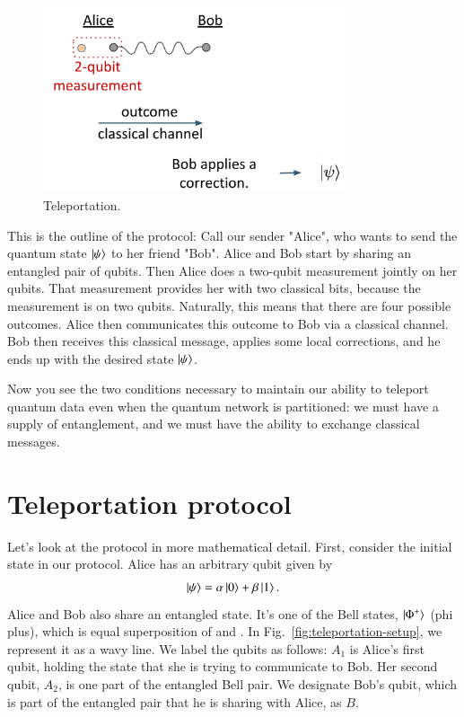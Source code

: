 \begin{figure}[H]
    \centering
    \includegraphics[width=0.8\textwidth]{lesson8/teleportation.png}
        \caption{Teleportation.}
    \label{fig:teleportation}
\end{figure}

This is the outline of the protocol: Call our sender "Alice", who wants to send the quantum state $\left| \psi \right\rangle$ to her friend "Bob".  Alice and Bob start by sharing an entangled pair of qubits. Then Alice does a two-qubit measurement jointly on her qubits. That measurement provides her with two classical bits, because the measurement is on two qubits.  Naturally, this means that there are four possible outcomes. Alice then communicates this outcome to Bob via a classical channel.  Bob then receives this classical message, applies some local corrections, and he ends up with the desired state $\left| \psi \right\rangle$. 

Now you see the two conditions necessary to maintain our ability to teleport quantum data even when the quantum network is partitioned: we must have a supply of entanglement, and we must have the ability to exchange classical messages.

\section{Teleportation protocol}
\label{sec:8-2_teleportation_protocol}


Let's look at the protocol in more mathematical detail.  First, consider the initial state in our protocol. Alice has an arbitrary qubit given by
\begin{align}
    \left| \psi \right\rangle = \alpha\left| 0 \right\rangle + \beta\left| 1 \right\rangle.
\end{align}
Alice and Bob also share an entangled state. It's one of the Bell states, $\left| \Phi^+ \right\rangle$ (phi plus), which is equal superposition of  and . In Fig.~\ref{fig:teleportation-setup}, we represent it as a wavy line. We label the qubits as follows: $A_1$ is Alice's first qubit, holding the state that she is trying to communicate to Bob.  Her second qubit, $A_2$, is one part of the entangled Bell pair. We designate Bob's qubit, which is part of the entangled pair that he is sharing with Alice, as $B$.

